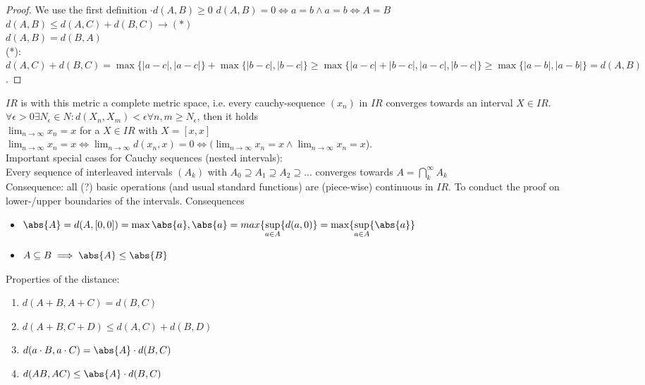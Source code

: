 \begin{proof}
	We use the first definition  
	$\cdot d(A,B)\ge 0$
	$d(A,B)= 0 \iff a=b \land a=b \iff A=B$\\
	$d(A,B)\le d(A,C)+d(B,C) \to (*)$ \\
	$d(A,B)=d(B,A)$ \\
	(*): $d(A,C)+d(B,C)= \max\{|a-c|,|a-c|\}+\max\{|b-c|,|b-c|\} \ge \max\{|a-c|+|b-c|,|a-c|,|b-c|\} \ge \max\{|a-b|,|a-b|\}= d(A,B)$.
\end{proof}
$IR$ is with this metric a complete metric space, i.e. every cauchy-sequence $(x_n)$ in $IR$ converges towards an interval $X\in IR$. \\
$\forall \epsilon>0 \exists N_{\epsilon}\in N: d(X_n,X_m)<\epsilon \forall n,m \ge N_{\epsilon}$, then it holds \\ $\lim_{n\to\infty} x_n=x$ for a $X\in IR$ with $X=[x,x]$ \\
$\lim_{n\to\infty} x_n=x \iff \lim_{n\to\infty} d(x_n,x)=0 \iff (\lim_{n\to\infty} x_n=x \land \lim_{n\to\infty} x_n=x$). \\
Important special cases for Cauchy sequences (nested intervals): \\
Every sequence of interleaved intervals $(A_k)$ with $A_0\supseteq A_1\supseteq A_2 \supseteq ... $ converges towards $A=\bigcap_k^\infty A_{k} $\\
Consequence: all (?) basic operations (and usual standard functions) are (piece-wise) continuous in $IR$. 
To conduct the proof on lower-/upper boundaries of the intervals.
Consequences
\begin{itemize}
	\item $\abs{A}=d(A,[0,0])=\max{\abs{a},\abs{a}}=max\{\sup\limits_{a\in A}\{d(a,0)\}=\max\{\sup\limits_{a\in A}\{\abs{a}\}$ 
	\item $A\subseteq B \implies \abs{A}\le \abs{B}$
\end{itemize}
\begin{proposition}
	Properties of the distance:
	\begin{enumerate}
		\item $d(A+B,A+C)=d(B,C)$ 
		\item $d(A+B,C+D)\le d(A,C)+ d(B,D)$
		\item $d(a\cdot B, a\cdot C)=\abs{A}\cdot d(B,C)$
		\item $d(AB,AC)\le \abs{A}\cdot d(B,C)$
	\end{enumerate}
\end{proposition}
